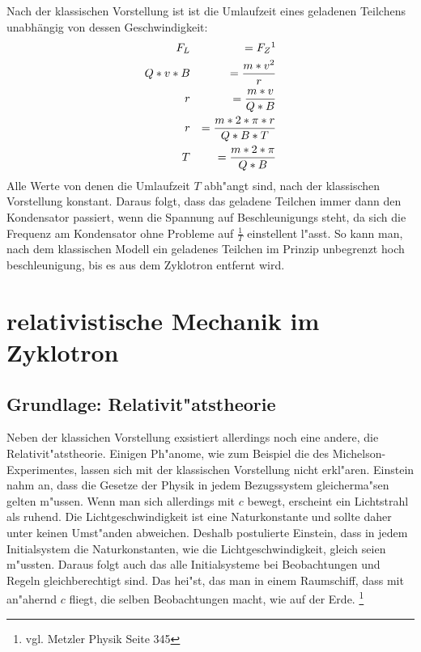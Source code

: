 \documentclass[14pt, a4paper]{report}
\begin{document}
Nach der klassischen Vorstellung ist ist die Umlaufzeit eines geladenen Teilchens 
unabhängig von dessen Geschwindigkeit:
\begin{eqnarray}
  F_L  		&& = F_Z  \footnotemark \\
  Q * v * B 	&& = \frac{m * v^2}{r} \\
  r		&& = \frac{m * v}{Q * B} \\
  r		&& = \frac{m * 2 * \pi * r}{Q * B * T} \\
  T		&& = \frac{m * 2 * \pi }{Q * B} \label{klassische_Umlaufzeit}
\end{eqnarray}
Alle Werte von denen die Umlaufzeit $T$ abh"angt sind, nach der klassischen Vorstellung
konstant. Daraus folgt, dass das geladene Teilchen immer dann den Kondensator passiert,
wenn die Spannung auf Beschleunigungs steht, da sich die Frequenz am Kondensator ohne
Probleme auf $\frac{1}{T}$ einstellent l"asst. So kann man, nach dem klassischen Modell
ein geladenes Teilchen im Prinzip unbegrenzt hoch beschleunigung, bis es aus dem
Zyklotron entfernt wird. \label{klassische_Erwartung}

\chapter{relativistische Mechanik im Zyklotron}
\section{Grundlage: Relativit"atstheorie}
Neben der klassichen Vorstellung exsistiert allerdings noch eine andere, die 
Relativit"atstheorie. Einigen Ph"anome, wie zum Beispiel die des Michelson-Experimentes,
lassen sich mit der klassischen Vorstellung nicht erkl"aren. Einstein nahm an, dass 
die Gesetze der Physik in jedem Bezugssystem gleicherma"sen gelten m"ussen. 
Wenn man sich allerdings mit $c$ bewegt, erscheint ein Lichtstrahl als ruhend. 
Die Lichtgeschwindigkeit ist eine Naturkonstante und sollte daher unter keinen 
Umst"anden abweichen. Deshalb postulierte Einstein, dass in jedem Initialsystem die 
Naturkonstanten, wie die Lichtgeschwindigkeit, gleich seien m"ussten. Daraus folgt auch
das alle Initialsysteme bei Beobachtungen und Regeln gleichberechtigt sind. Das hei"st,
das man in einem Raumschiff, dass mit an"ahernd $c$ fliegt, die selben Beobachtungen 
macht, wie auf der Erde.
\footnote{vgl. Metzler Physik Seite 345}
\end{document}
